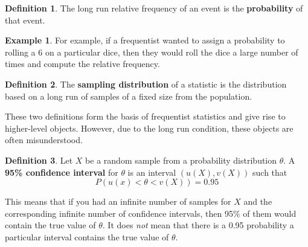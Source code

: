 \documentclass[
]{book}
\theoremstyle{definition}
\newtheorem{definition}{Definition}[chapter]
\theoremstyle{definition}
\newtheorem{example}{Example}[chapter]
\theoremstyle{definition}
\theoremstyle{definition}
\theoremstyle{remark}
\begin{document}
\begin{definition}
The long run relative frequency of an event is the \textbf{probability} of that event.
\end{definition}

\begin{example}
For example, if a frequentist wanted to assign a probability to rolling a 6 on a particular dice, then they would roll the dice a large number of times and compute the relative frequency.
\end{example}

\begin{definition}
The \textbf{sampling distribution} of a statistic is the distribution based on a long run of samples of a fixed size from the population.
\end{definition}

These two definitions form the basis of frequentist statistics and give rise to higher-level objects. However, due to the long run condition, these objects are often misunderstood.

\begin{definition}
Let \(X\) be a random sample from a probability distribution \(\theta\). A \textbf{95\% confidence interval} for \(\theta\) is an interval \((u(X), v(X))\) such that
\[
P(u(x) < \theta < v(X)) = 0.95
\]
\end{definition}

This means that if you had an infinite number of samples for \(X\) and the corresponding infinite number of confidence intervals, then 95\% of them would contain the true value of \(\theta\). It does \emph{not} mean that there is a 0.95 probability a particular interval contains the true value of \(\theta\).
\end{document}
